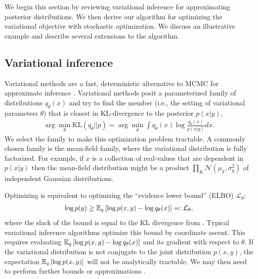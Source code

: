 We begin this section by reviewing variational inference for
approximating posterior distributions.  We then derive our algorithm
for optimizing the variational objective with stochastic optimization.
We discuss an illustrative example and describe several extensions to
the algorithm.

\subsection{Variational inference}

Variational methods are a fast, deterministic alternative to MCMC for
approximate inference \cite{jordan:2003,jordan:1999}. Variational
methods posit a parameterized family of distributions $q_{\theta}(x)$
and try to find the member (i.e., the setting of variational
parameters $\theta$) that is closest in KL-divergence to the posterior
$p(x | y)$,
\begin{align}
  \arg \min_{\theta} \mbox{KL}(q_\theta || p) = \arg \min_{\theta}
  \int q_\theta(x) \log \frac{q_\theta(x)}{p(x | y)} dx.
  \label{eq:stochastic_variational_objective}
\end{align}
We select the family to make this optimization problem tractable.  A
commonly chosen family is the mean-field family, where the variational
distribution is fully factorized.  For example, if $x$ is a collection
of real-values that are dependent in $p(x | y)$ then the mean-field
distribution might be a product $\prod_K \mathcal{N}(\mu_k,
\sigma_k^2)$ of independent Gaussian distributions.




Optimizing  is equivalent to optimizing
the ``evidence lower bound'' (ELBO) $\mathcal{L}_\theta$:
\begin{eqnarray}
  \log p(y) \ge \mathbb{E}_q\left[\log p(x, y) - \log q_\theta(x)\right]
  =: \mathcal{L}_\theta,
  \label{eq:stochastic_traditional_variational_objective}
\end{eqnarray}
where the slack of the bound is equal to the KL divergence from
.  Typical variational inference
algorithms optimize this bound by coordinate ascent.  This requires
evaluating $\mathbb{E}_q\left[ \log p(x, y) - \log q_\theta(x)\right]$ and its
gradient with respect to $\theta$. If the variational distribution is
not conjugate to the joint distribution $p(x, y)$, the expectation
$\mathbb{E}_q\left[ \log p(x, y)\right]$ will not be analytically tractable. We may
then need to perform further bounds or approximations
\cite{jaakkola:2000,jordan:1999,bickel:2007,braun:2007}.


